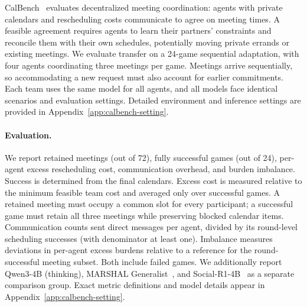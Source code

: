 CalBench~\citep{zou2026calbench} evaluates decentralized meeting coordination:
agents with private calendars and rescheduling costs communicate to agree on
meeting times. A feasible agreement requires agents to learn their partners'
constraints and reconcile them with their own schedules, potentially moving
private errands or existing meetings. We evaluate transfer on a 24-game
sequential adaptation, with four agents coordinating three meetings per
game. Meetings arrive sequentially, so accommodating a new request must also
account for earlier commitments. Each team uses the same model for all
agents, and all models face identical scenarios and evaluation settings.
Detailed environment and inference settings are provided in
Appendix~\ref{app:calbench-setting}.

\paragraph{Evaluation.}
We report retained meetings (out of 72), fully successful games (out of 24),
per-agent excess rescheduling cost, communication overhead, and burden
imbalance. Success is determined from the final calendars. Excess cost is
measured relative to the minimum feasible team cost and averaged only over
successful games. A retained meeting must occupy a common slot for every
participant; a successful game must retain all three meetings while
preserving blocked calendar items. Communication counts sent direct messages
per agent, divided by its round-level scheduling successes (with denominator
at least one). Imbalance measures deviations in per-agent excess burdens
relative to a reference for the round-successful meeting subset. Both include
failed games. We additionally report Qwen3-4B (thinking), MARSHAL
Generalist~\citep{yuan2026marshal}, and Social-R1-4B~\citep{wu2026socialr1}
as a separate comparison group. Exact metric definitions and model details
appear in Appendix~\ref{app:calbench-setting}.

